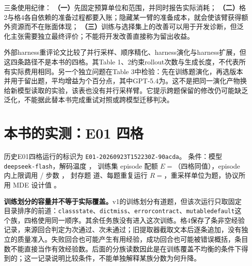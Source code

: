 \begin{sloppypar}
三条使用纪律：
\textbf{（一）}先固定预算单位和范围，并同时报告实际消耗；
\textbf{（二）}格2与格4各自依赖的准备过程都要入账；隐藏某一臂的准备成本，就会使该臂获得额外资源而不在账面体现；
\textbf{（三）}训练与选择集上的改善可以用于开发诊断，但泛化主张需要独立最终评价；不能将开发改善直接称为留出收益。
\end{sloppypar}

\begin{sloppypar}
外部harness重评论文比较了并行采样、顺序精化、harness演化与harness扩展，但这四条路径不是本书的四格\cite{harness-eval-2607}。其Table 1、2约束rollout次数与生成长度，不代表所有实际费用相同。另一个独立问题在Table 3中检验：先在训练题演化，再选版本并用于留出题，平均增益为个百分点，其中GPT-5.4为。这不是把同一演化产物换给新模型读取的实验，该表也没有并行采样臂。它提示跨题保留的修改仍可能缺乏泛化，不能据此替本书完成重试对照或跨模型迁移判决。
\end{sloppypar}

\section{本书的实测：E01 四格}
\label{sec:ch03-e01}

\begin{sloppypar}
历史E01四格运行的标识为 \texttt{E01-20260923T152230Z-90acda}。
条件：模型 \texttt{deepseek-flash}，解码温度 ，
训练集 episode 配额 $E=$（四格同值），episode 内上限调用  / 步数 ，
封存题  道、每题重复运行 $R=$，重采样单位为题，协议所用 MDE 设计值 。
\end{sloppypar}

\textbf{训练划分的容量并不等于实际覆盖。}v1的训练划分有道题，但该次运行只取固定目录排序的前道：\texttt{classstate}、\texttt{dictmiss}、\texttt{errorcontract}、\texttt{mutabledefault}这个族，四格使用同一顺序。其余任务族没有进入这次训练。格4保存了条非空经验记录，来源回合判定为次通过、次未通过；旧提取器截取文本后逐条追加，没有独立的质量准入。失败回合也可能产生有用经验，成功回合也可能被错误概括，条目数不能直接当作有效经验数。后面的分族读数因此是在训练覆盖不均衡的条件下得到的；这一记录说明比较条件，不能单独解释某族分数为何升降。


